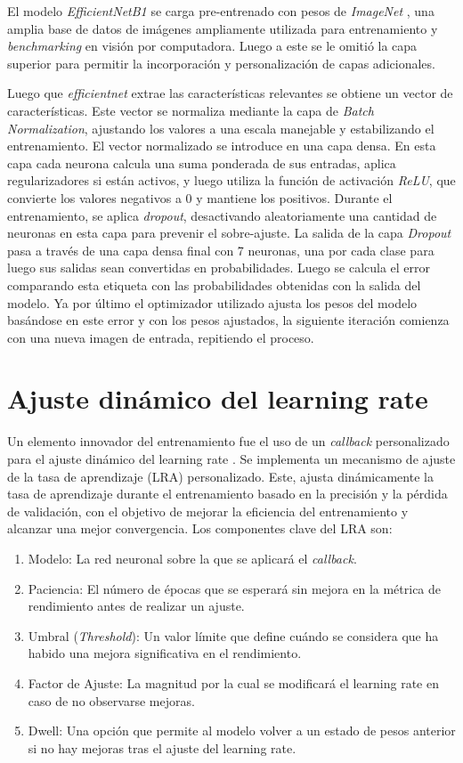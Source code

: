 El modelo \textit{EfficientNetB1} se carga pre-entrenado con pesos de \textit{ImageNet} , una amplia base de datos de imágenes ampliamente utilizada para entrenamiento y \textit{benchmarking} en visión por computadora. Luego a este se le omitió la capa superior para permitir la incorporación y personalización de capas adicionales. 

Luego que \textit{efficientnet} extrae las características relevantes se obtiene un vector de características. Este vector se normaliza mediante la capa de \textit{Batch Normalization}, ajustando los valores a una escala manejable y estabilizando el entrenamiento. El vector normalizado se introduce en una capa densa. En esta capa cada neurona calcula una suma ponderada de sus entradas, aplica regularizadores si están activos, y luego utiliza la función de activación \textit{ReLU}, que convierte los valores negativos a 0 y mantiene los positivos. Durante el entrenamiento, se aplica \textit{dropout}, desactivando aleatoriamente una cantidad de neuronas en esta capa para prevenir el sobre-ajuste. La salida de  la capa \textit{Dropout} pasa a través de una capa densa final con 7 neuronas, una por cada clase para luego sus salidas sean convertidas en probabilidades. Luego se calcula el error comparando esta etiqueta con las probabilidades obtenidas con la salida del modelo. Ya por último el optimizador utilizado ajusta los pesos del modelo basándose en este error y con los pesos ajustados, la siguiente iteración comienza con una nueva imagen de entrada, repitiendo el proceso.

\section{Ajuste dinámico del learning rate}

Un elemento innovador del entrenamiento fue el uso de un \textit{callback} personalizado para el ajuste dinámico del learning rate . Se implementa un mecanismo de ajuste de la tasa de aprendizaje (LRA) personalizado. Este, ajusta dinámicamente la tasa de aprendizaje durante el entrenamiento basado en la precisión y la pérdida de validación, con el objetivo de mejorar la eficiencia del entrenamiento y alcanzar una mejor convergencia. Los componentes clave del LRA son:

\begin{enumerate}
   \item Modelo: La red neuronal sobre la que se aplicará el \textit{callback}.
   \item Paciencia: El número de épocas que se esperará sin mejora en la métrica de rendimiento antes de realizar un ajuste.
   \item Umbral (\textit{Threshold}): Un valor límite que define cuándo se considera que ha habido una mejora significativa en el rendimiento.
   \item Factor de Ajuste: La magnitud por la cual se modificará el learning rate en caso de no observarse mejoras.
   \item Dwell: Una opción que permite al modelo volver a un estado de pesos anterior si no hay mejoras tras el ajuste del learning rate.
\end{enumerate}

